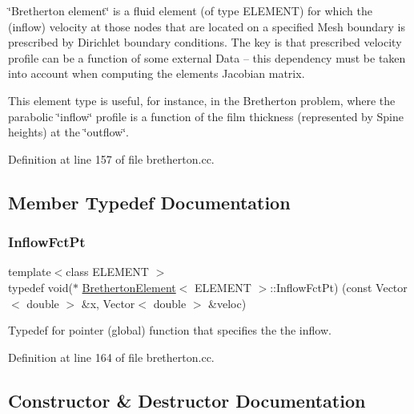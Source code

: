 \char`\"{}\+Bretherton element\char`\"{} is a fluid element (of type E\+L\+E\+M\+E\+NT) for which the (inflow) velocity at those nodes that are located on a specified Mesh boundary is prescribed by Dirichlet boundary conditions. The key is that prescribed velocity profile can be a function of some external Data -- this dependency must be taken into account when computing the element\textquotesingle{}s Jacobian matrix.

This element type is useful, for instance, in the Bretherton problem, where the parabolic \char`\"{}inflow\char`\"{} profile is a function of the film thickness (represented by Spine heights) at the \char`\"{}outflow\char`\"{}. 

Definition at line 157 of file bretherton.\+cc.



\subsection{Member Typedef Documentation}
\mbox{\label{classBrethertonElement_a313d868ce6fbd8df07b0360db25133ce}} 
\subsubsection{\texorpdfstring{Inflow\+Fct\+Pt}{InflowFctPt}}
{\footnotesize\ttfamily template$<$class E\+L\+E\+M\+E\+NT $>$ \\
typedef void($\ast$ \hyperlink{classBrethertonElement}{Bretherton\+Element}$<$ E\+L\+E\+M\+E\+NT $>$\+::Inflow\+Fct\+Pt) (const Vector$<$ double $>$ \&x, Vector$<$ double $>$ \&veloc)}



Typedef for pointer (global) function that specifies the the inflow. 



Definition at line 164 of file bretherton.\+cc.



\subsection{Constructor \& Destructor Documentation}
\mbox{\label{classBrethertonElement_acbc668eed3ea683a67b6b822d6e59974}} 
